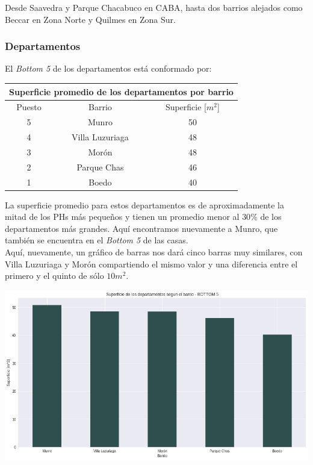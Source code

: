 \documentclass[a4paper, 10pt]{article}
\newcommand\tab[1][0.5cm]{\hspace*{#1}}
\begin{document}
				  	\tab Desde Saavedra y Parque Chacabuco en CABA, hasta dos barrios alejados como Beccar en Zona Norte y Quilmes
				  	en Zona Sur.
				\subsubsection{Departamentos}
					El \emph{Bottom 5} de los departamentos está conformado por:
					\begin{center}
						\begin{tabular}{ |c|c|c| }
							\hline
							\multicolumn{3}{|c|}{Superficie promedio de los departamentos por barrio}\\
							\hline
							\hline
							Puesto & Barrio & Superficie [$m^2$]\\
							\hline
							5 & Munro & 50\\
							4 & Villa Luzuriaga & 48\\
							3 & Morón & 48\\
							2 & Parque Chas & 46\\
							1 & Boedo & 40\\
							\hline
						\end{tabular}
					\end{center}
					\tab La superficie promedio para estos departamentos es de aproximadamente la mitad de los PHs más pequeños
					y tienen un promedio menor al $30\%$ de los departamentos más grandes. Aquí encontramos nuevamente a Munro, que
					también se encuentra en el \emph{Bottom 5} de las casas. \\
					\tab Aquí, nuevamente, un gráfico de barras nos dará cinco barras muy similares, con Villa Luzuriaga y Morón
					compartiendo el mismo valor y una diferencia entre el primero y el quinto de sólo  $10m^2$.
					\begin{center}
   		    				\includegraphics[width=\textwidth]{images/apartmentSurfaceBottomBar}
				  	\end{center}
\end{document}
